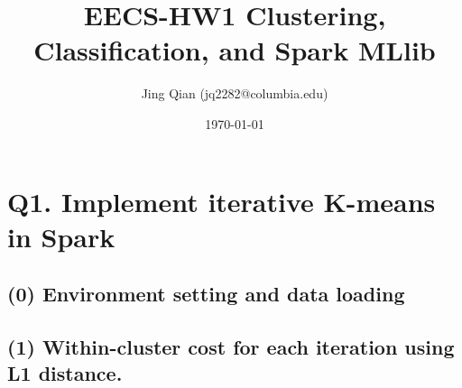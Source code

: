 \documentclass{article}
\title{EECS-HW1 Clustering, Classification, and Spark MLlib}
\author{Jing Qian (jq2282@columbia.edu)}
\date{\today}
\begin{document}
\maketitle

\section*{Q1. Implement iterative K-means in Spark}
\subsection*{(0) Environment setting and data loading}

\subsection*{(1) Within-cluster cost for each iteration using L1 distance.}


\end{document}
